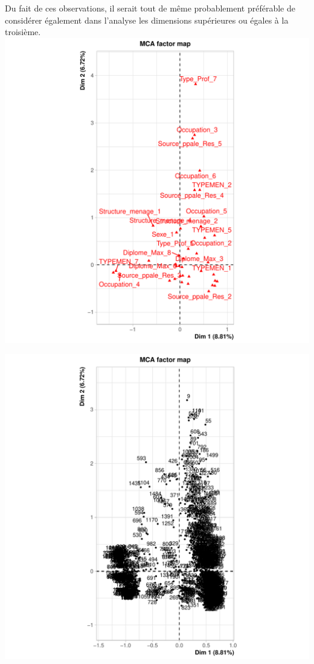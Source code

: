 \documentclass[11pt,a4paper, x11names]{article}\usepackage[]{graphicx}\usepackage[]{color}
\makeatletter
\def\maxwidth{ %
  \ifdim\Gin@nat@width>\linewidth
    \linewidth
  \else
    \Gin@nat@width
  \fi
}
\newenvironment{knitrout}{}{} %
\makeatother
\begin{document}
Du fait de ces observations, il serait tout de même probablement préférable de considérer également dans l’analyse les dimensions supérieures ou égales à la troisième.
\begin{knitrout}
\color{fgcolor}
\includegraphics[width=\maxwidth]{figure/unnamed-chunk-13-1} 

\includegraphics[width=\maxwidth]{figure/unnamed-chunk-13-2} 


\end{knitrout}
\end{document}
